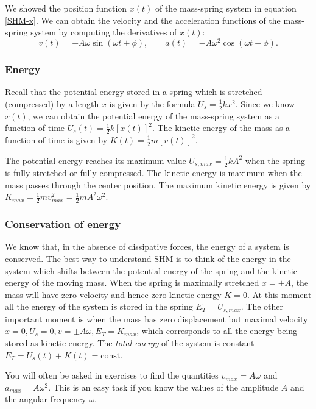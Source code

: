\documentclass[letterpaper,9pt,journal]{IEEEtran}
\newcommand{\be}{\begin{equation}}
\newcommand{\ee}{\end{equation}}
\begin{document}
We showed the position function $x(t)$ of the mass-spring system in equation \eqref{SHM-x}.
We can obtain the velocity and the acceleration functions of the mass-spring system
by computing the derivatives of $x(t)$:
\be
v(t) = -A\omega \sin(\omega t + \phi),  \qquad a(t) = -A\omega^2\cos(\omega t + \phi).
\label{SHM-va}
\ee


\subsubsection{Energy}

Recall that the potential energy stored in a spring which is stretched (compressed) by 
a length $x$ is given by the formula $U_s=\frac{1}{2}k x^2$.
Since we know $x(t)$, we can obtain the potential energy of the mass-spring
system as a function of time $U_s(t)= \frac{1}{2} k[x(t)]^2$.
The kinetic energy of the mass as a function of time is given by
$K(t)= \frac{1}{2} m[v(t)]^2$.

The potential energy reaches its maximum value $U_{s,max}=\frac{1}{2}kA^2$
when the spring is fully stretched or fully compressed.
The kinetic energy is maximum when the mass passes through the center position.
The maximum kinetic energy is given by 
$K_{max} = \frac{1}{2} mv_{max}^2= \frac{1}{2}mA^2\omega^2$.



\subsubsection{Conservation of energy}

We know that, in the absence of dissipative forces, the energy of a system is conserved.
The best way to understand SHM is to think of the energy in the system which
shifts between the potential energy of the spring and the kinetic energy of the moving mass.
When the spring is maximally stretched $x=\pm A$, 
the mass will have zero velocity and hence zero kinetic energy $K=0$. 
At this moment all the energy of the system is stored in the spring  $E_T= U_{s,max}$.
The other important moment is when the mass has zero displacement but maximal velocity 
$x=0, U_s=0, v=\pm A\omega, E_T=K_{max}$,
which corresponds to all the energy being stored as kinetic energy.
The \emph{total energy} of the system is constant $E_T = U_s(t) + K(t) = \text{const}$.

You will often be asked in exercises  to find the quantities $v_{max}= A \omega$ and $a_{max} = A \omega^2$.
This is an easy task if you know the values of the amplitude $A$ and 
the angular frequency $\omega$.
\end{document}
